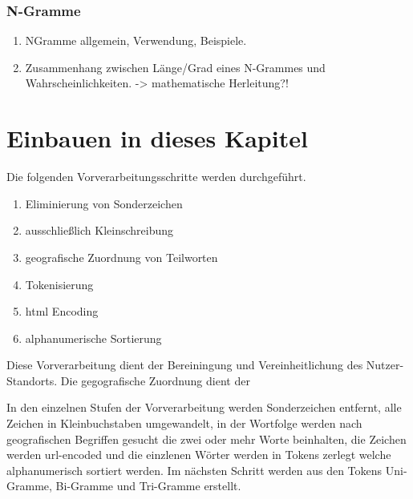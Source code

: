 		\subsubsection{N-Gramme}
			\begin{enumerate}
				\item NGramme allgemein, Verwendung, Beispiele. 
				\item {} Zusammenhang zwischen Länge/Grad eines N-Grammes und Wahrscheinlichkeiten. -> mathematische Herleitung?!
			\end{enumerate}




\section{Einbauen in dieses Kapitel}

Die folgenden Vorverarbeitungsschritte werden durchgeführt.

	\begin{enumerate}
		\item Eliminierung von Sonderzeichen
		\item ausschließlich Kleinschreibung
		\item geografische Zuordnung von Teilworten  	
		\item Tokenisierung
		\item html Encoding
		\item alphanumerische Sortierung 
	\end{enumerate}

	Diese Vorverarbeitung dient der Bereiningung und Vereinheitlichung des Nutzer-Standorts.  
	Die gegografische Zuordnung dient der  

	In den einzelnen Stufen der Vorverarbeitung werden Sonderzeichen entfernt, alle Zeichen in Kleinbuchstaben umgewandelt, in der Wortfolge werden nach geografischen Begriffen gesucht die zwei oder mehr Worte beinhalten, die Zeichen werden url-encoded und die einzlenen Wörter werden in Tokens zerlegt welche alphanumerisch sortiert werden.
	Im nächsten Schritt werden aus den Tokens Uni-Gramme, Bi-Gramme und Tri-Gramme erstellt. 



